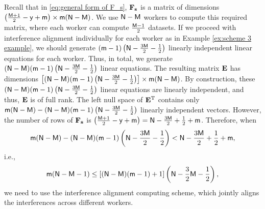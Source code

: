 \documentclass[conference,letterpaper]{IEEEtran}
\begin{document}
Recall that in \eqref{eq:general form of F_s}, ${\bf F}_{\bf s}$ is a matrix of dimensions $\left( \frac{{\sf M} + 1}{2} - {\sf y} + {\sf m} \right) \times {\sf m}({\sf N} - {\sf M})$. We use ${\sf N}-{\sf M}$ workers to compute this required matrix, where each worker can compute $\frac{{\sf M} - 1}{2}$ datasets. If we proceed with interference alignment individually for each worker as in Example \ref{ex:scheme 3 example}, we should generate $({\sf m}-1)\left({\sf N} - \frac{3{\sf M}}{2} - \frac{1}{2}\right)$ linearly independent linear equations for each worker. Thus, in total, we generate $({\sf N}-{\sf M})({\sf m}-1)\left({\sf N} - \frac{3{\sf M}}{2} - \frac{1}{2}\right)$ linear equations. The resulting matrix ${\bf E}$ has dimensions $ \left[ ({\sf N}-{\sf M})({\sf m}-1)\left({\sf N} - \frac{3{\sf M}}{2} - \frac{1}{2}\right) \right] \times {\sf m}({\sf N}-{\sf M})$. By construction, these $({\sf N}-{\sf M})({\sf m}-1)\left({\sf N} - \frac{3{\sf M}}{2} - \frac{1}{2}\right)$ linear equations are linearly independent, and thus, ${\bf E}$ is of full rank. The left null space of ${\bf E}^{\text{\rm T}}$ contains only ${\sf m}({\sf N}-{\sf M}) - ({\sf N}-{\sf M})({\sf m}-1)\left({\sf N} - \frac{3{\sf M}}{2} - \frac{1}{2}\right)$ linearly independent vectors. However, the number of rows of ${\bf F}_{\bf s}$ is $\left( \frac{{\sf M} + 1}{2} - {\sf y} + {\sf m} \right) = {\sf N} - \frac{3{\sf M}}{2} + \frac{1}{2} + {\sf m}$. Therefore, when 
$$ {\sf m}({\sf N}-{\sf M}) - ({\sf N}-{\sf M})({\sf m}-1)\left({\sf N} - \frac{3{\sf M}}{2} - \frac{1}{2}\right) < {\sf N} - \frac{3{\sf M}}{2} + \frac{1}{2} + {\sf m}, $$
i.e.,
$$ {\sf m}({\sf N} - {\sf M} - 1) \leq \left[ ({\sf N} - {\sf M})({\sf m} - 1) + 1 \right] \left( {\sf N} - \frac{3}{2} {\sf M} - \frac{1}{2} \right), $$
we need to use the interference alignment computing scheme, which jointly aligns the interferences across different workers.




\end{document}
